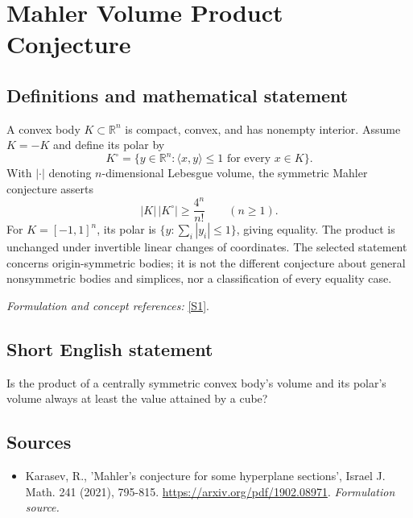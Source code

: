 \documentclass[11pt]{article}
\begin{document}
\section*{\texorpdfstring{Mahler Volume Product Conjecture}{Mahler Volume Product Conjecture}}\label{30001387}
\subsection{Definitions and mathematical statement}
A convex body $K\subset{\mathbb{R}}^n$ is compact, convex, and has nonempty interior. Assume $K=-K$ and define its polar by
\[
 K^\circ=\{y\in{\mathbb{R}}^n:\langle x,y\rangle\le1\text{ for every }x\in K\}.
\]
With $|\cdot|$ denoting $n$-dimensional Lebesgue volume, the symmetric Mahler conjecture asserts
\[
 |K|\,|K^\circ|\ge\frac{4^n}{n!}\qquad(n\ge1).
\]
For $K=[-1,1]^n$, its polar is $\{y:\sum_i|y_i|\le1\}$, giving equality. The product is unchanged under invertible linear changes of coordinates. The selected statement concerns origin-symmetric bodies; it is not the different conjecture about general nonsymmetric bodies and simplices, nor a classification of every equality case.
\par\smallskip\textit{Formulation and concept references:} \href{https://arxiv.org/pdf/1902.08971}{[S1]}.

\subsection{Short English statement}
Is the product of a centrally symmetric convex body's volume and its polar's volume always at least the value attained by a cube?
\subsection{Sources}
\begin{itemize}
\item[S1]Karasev, R., 'Mahler's conjecture for some hyperplane sections', Israel J. Math. 241 (2021), 795-815.
\url{https://arxiv.org/pdf/1902.08971}.
\textit{Formulation source.}
\end{itemize}
\end{document}
